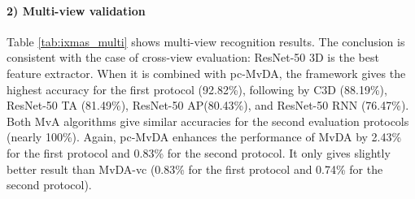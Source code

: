     \paragraph{2) Multi-view validation} Table \ref{tab:ixmas_multi} shows multi-view recognition results. The conclusion is consistent with the case of cross-view evaluation: ResNet-50 3D is the best feature extractor. When it is combined with pc-MvDA, the framework gives the highest accuracy for the first protocol (92.82\%), following by C3D (88.19\%), ResNet-50 TA (81.49\%), ResNet-50 AP(80.43\%), and ResNet-50 RNN (76.47\%). Both MvA algorithms give similar accuracies for the second evaluation protocols (nearly 100\%). Again, pc-MvDA enhances the performance of MvDA by 2.43\% for the first protocol and 0.83\% for the second protocol. It only gives slightly better result than MvDA-vc (0.83\% for the first protocol and 0.74\% for the second protocol). 

    \begin{table}[htbp]
    \centering
    \caption{Multi-view recognition comparison on IXMAS dataset}
    \label{tab:ixmas_multi}
    \end{table}

